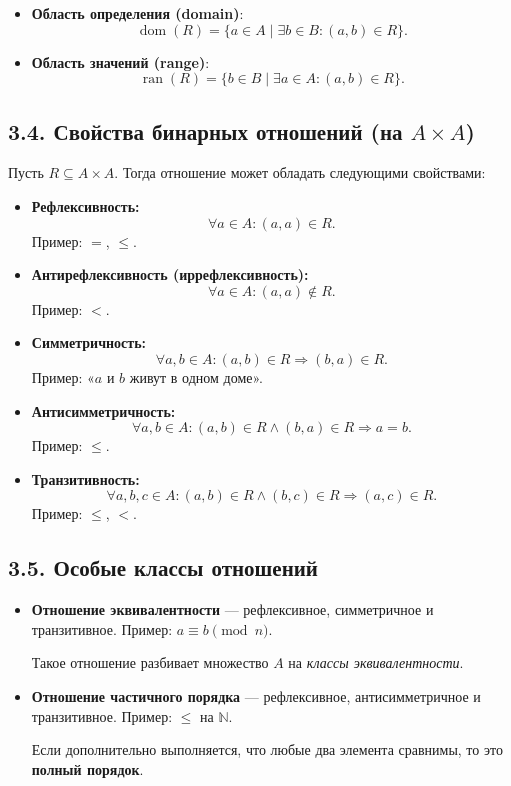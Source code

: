 \documentclass{article}
\begin{document}
\begin{itemize}[leftmargin=*]
  \item \textbf{Область определения (domain)}:
  \[
  \operatorname{dom}(R) = \{ a \in A \mid \exists b \in B\colon (a,b) \in R \}.
  \]
  \item \textbf{Область значений (range)}:
  \[
  \operatorname{ran}(R) = \{ b \in B \mid \exists a \in A\colon (a,b) \in R \}.
  \]
\end{itemize}

\subsection*{3.4. Свойства бинарных отношений (на $A \times A$)}

Пусть $R \subseteq A \times A$. Тогда отношение может обладать следующими свойствами:

\begin{itemize}[leftmargin=*]
  \item \textbf{Рефлексивность:}
  \[
  \forall a \in A\colon (a,a) \in R.
  \]
  Пример: $=$, $\le$.

  \item \textbf{Антирефлексивность (иррефлексивность):}
  \[
  \forall a \in A\colon (a,a) \notin R.
  \]
  Пример: $<$.

  \item \textbf{Симметричность:}
  \[
  \forall a,b \in A\colon (a,b) \in R \Rightarrow (b,a) \in R.
  \]
  Пример: «$a$ и $b$ живут в одном доме».

  \item \textbf{Антисимметричность:}
  \[
  \forall a,b \in A\colon (a,b)\in R \wedge (b,a)\in R \Rightarrow a = b.
  \]
  Пример: $\le$.

  \item \textbf{Транзитивность:}
  \[
  \forall a,b,c \in A\colon (a,b)\in R \wedge (b,c)\in R \Rightarrow (a,c)\in R.
  \]
  Пример: $\le$, $<$.
\end{itemize}

\subsection*{3.5. Особые классы отношений}

\begin{itemize}[leftmargin=*]
  \item \textbf{Отношение эквивалентности} — рефлексивное, симметричное и транзитивное.  
  Пример: $a \equiv b \pmod{n}$.

  Такое отношение разбивает множество $A$ на \textit{классы эквивалентности}.

  \item \textbf{Отношение частичного порядка} — рефлексивное, антисимметричное и транзитивное.  
  Пример: $\le$ на $\mathbb{N}$.

  Если дополнительно выполняется, что любые два элемента сравнимы, то это \textbf{полный порядок}.
\end{itemize}
\end{document}
